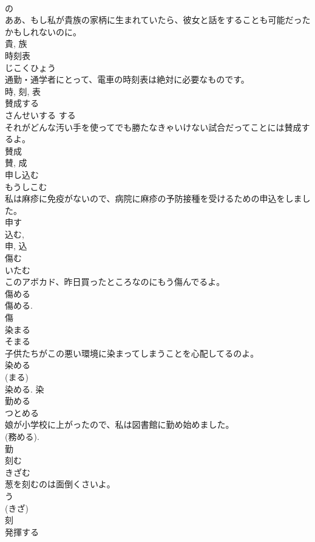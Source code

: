 \documentclass[8pt]{extreport}
\begin{document}
\begin{CJK}{UTF8}{min}
\\	の 
\\	ああ、もし私が貴族の家柄に生まれていたら、彼女と話をすることも可能だったかもしれないのに。	
\\	貴, 族	
\\	時刻表	
\\	じこくひょう	
\\	通勤・通学者にとって、電車の時刻表は絶対に必要なものです。	
\\	時, 刻, 表	
\\	賛成する	
\\	さんせいする	する 
\\	それがどんな汚い手を使ってでも勝たなきゃいけない試合だってことには賛成するよ。	
\\	賛成 
\\	賛, 成	
\\	申し込む	
\\	もうしこむ	
\\	私は麻疹に免疫がないので、病院に麻疹の予防接種を受けるための申込をしました。	
\\	申す 
\\	込む, 
\\	申, 込	
\\	傷む	
\\	いたむ	
\\	このアボカド、昨日買ったところなのにもう傷んでるよ。	
\\	傷める 
\\	傷める. 
\\	傷	
\\	染まる	
\\	そまる	
\\	子供たちがこの悪い環境に染まってしまうことを心配してるのよ。	
\\	染める 
\\	(まる) 
\\	染める.	染	
\\	勤める	
\\	つとめる	
\\	娘が小学校に上がったので、私は図書館に勤め始めました。	
\\	(務める). 
\\	勤	
\\	刻む	
\\	きざむ	
\\	葱を刻むのは面倒くさいよ。	
\\	う 
\\	(きざ) 
\\	刻	
\\	発揮する	

\end{CJK}
\end{document}
